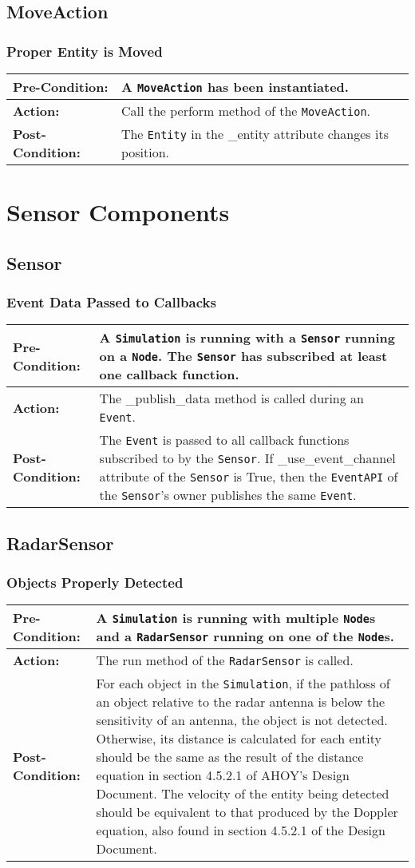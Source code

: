 \documentclass[titlepage]{article}
\newcommand{\testcase}[3]{
    \begin{center}
    \begin{tabular}{| l | p{0.7\textwidth}|}
        \hline
        \rowcolor[gray]{0.8}\textbf{Pre-Condition:} & #1 \\ \hline
        \textbf{Action:} & #2 \\ \hline
        \rowcolor[gray]{0.8}\textbf{Post-Condition:} & #3 \\ \hline
    \end{tabular}
    \end{center}
}
\begin{document}

\subsection{MoveAction}
\subsubsection{Proper Entity is Moved}
\testcase{A \texttt{MoveAction} has been instantiated.}{Call the perform method of the \texttt{MoveAction}.}{The
\texttt{Entity} in the \_entity attribute changes its position.}


\section{Sensor Components}
\subsection{Sensor}
\subsubsection{Event Data Passed to Callbacks}
\testcase{A \texttt{Simulation} is running with a \texttt{Sensor} running on a \texttt{Node}. The \texttt{Sensor} has
subscribed at least one callback function.}{The \_publish\_data method is called during an \texttt{Event}.}{The
\texttt{Event} is passed to all callback functions subscribed to by the \texttt{Sensor}. If \_use\_event\_channel
attribute of the \texttt{Sensor} is True, then the \texttt{EventAPI} of the \texttt{Sensor}'s owner publishes the same
\texttt{Event}.}

\subsection{RadarSensor}
\subsubsection{Objects Properly Detected}
\testcase{A \texttt{Simulation} is running with multiple \texttt{Node}s and a \texttt{RadarSensor} running on one of the
\texttt{Node}s.}{The run method of the \texttt{RadarSensor} is called.}{For each object in the \texttt{Simulation}, if
the pathloss of an object relative to the radar antenna is below the sensitivity of an antenna, the object is not
detected.  Otherwise, its distance is calculated for each entity should be the same as the result of the distance
equation in section 4.5.2.1 of AHOY's Design Document. The velocity of the entity being detected should be equivalent to
that produced by the Doppler equation, also found in section 4.5.2.1 of the Design Document.}
\end{document}
